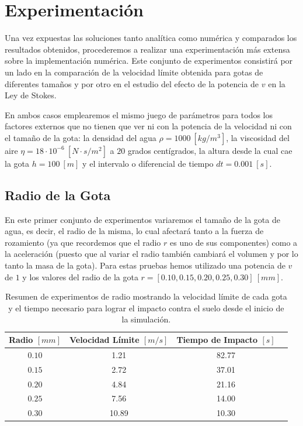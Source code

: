 \documentclass[journal]{IEEEtran}
\begin{document}
\section{Experimentación}

Una vez expuestas las soluciones tanto analítica como numérica y comparados los resultados obtenidos, procederemos a realizar una experimentación más extensa sobre la implementación numérica. Este conjunto de experimentos consistirá por un lado en la comparación de la velocidad límite obtenida para gotas de diferentes tamaños y por otro en el estudio del efecto de la potencia de $v$ en la Ley de Stokes.

En ambos casos emplearemos el mismo juego de parámetros para todos los factores externos que no tienen que ver ni con la potencia de la velocidad ni con el tamaño de la gota: la densidad del agua $\rho = 1000~[kg/m^3]$, la viscosidad del aire $\eta = 18 \cdot 10^{-6}~[N\cdot s/m^2]$ a $20$ grados centígrados, la altura desde la cual cae la gota $h = 100~[m]$ y el intervalo o diferencial de tiempo $dt = 0.001~[s]$.

\subsection{Radio de la Gota}

En este primer conjunto de experimentos variaremos el tamaño de la gota de agua, es decir, el radio de la misma, lo cual afectará tanto a la fuerza de rozamiento (ya que recordemos que el radio $r$ es uno de sus componentes) como a la aceleración (puesto que al variar el radio también cambiará el volumen y por lo tanto la masa de la gota). Para estas pruebas hemos utilizado una potencia de $v$ de $1$ y los valores del radio de la gota $r = [0.10, 0.15, 0.20, 0.25, 0.30]~[mm]$.

\begin{table}[!htb]
	\begin{tabular}{cccc}
		Radio $[mm]$ & Velocidad Límite $[m/s]$ & Tiempo de Impacto $[s]$\\
		\hline
		$0.10$ & 1.21 & 82.77\\
		$0.15$ & 2.72 & 37.01\\
		$0.20$ & 4.84 & 21.16\\
		$0.25$ & 7.56 & 14.00\\
		$0.30$ & 10.89 & 10.30\\
	\end{tabular}
  \caption{Resumen de experimentos de radio mostrando la velocidad límite de cada gota y el tiempo necesario para lograr el impacto contra el suelo desde el inicio de la simulación.}
  \label{table:radio}
\end{table}
\end{document}
